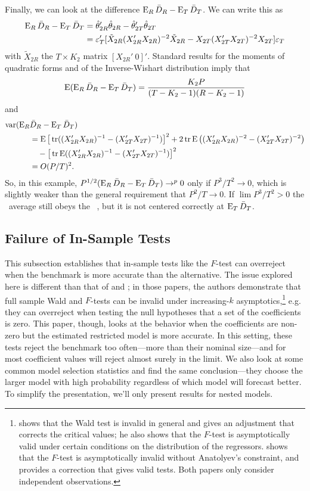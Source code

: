 \documentclass[11pt]{article}
\newcommand{\e}{\varepsilon}
\newcommand{\eb}{\mathbf{\e}}
\begin{document}
Finally, we can look at the difference $\operatorname{E}_R \bar{D}_R - \operatorname{E}_T
\bar{D}_T$.  We can write this as
\begin{align*}
  \E_R \oosA - \E_T \oosB &= \hat{\theta}_{2R}'
  \hat{\theta}_{2R} - \hat{\theta}_{2T}' \hat{\theta}_{2T} \\ &=
  \eb_T'[\tilde{X}_{2R}(X_{2R}'X_{2R})^{-2}
  \tilde{X}_{2R} - X_{2T}(X_{2T}'X_{2T})^{-2} X_{2T} ] \eb_T
\end{align*}
with $\tilde{X}_{2R}$ the $T \times K_2$ matrix $[X_{2R}'\ 0]'$.
Standard results for the moments of quadratic forms and of the
Inverse-Wishart distribution \citep{Haf:79} imply that
\begin{equation*}
  \operatorname{E}(\operatorname{E}_R \bar{D}_{R} - \operatorname{E}_T \bar{D}_{T}) = \frac{K_2 P}{(T - K_2 - 1)(R - K_2 - 1)}
\end{equation*}
and
\begin{align*}
  \operatorname{var}(\operatorname{E}_R & \bar{D}_{R} - \operatorname{E}_T \bar{D}_{T}) \\ &= \operatorname{E}
  \big[\operatorname{tr}((X_{2R}'X_{2R})^{-1} - (X_{2T}'X_{2T})^{-1})\big]^2 + 2 \operatorname{tr}
  \operatorname{E}\big((X_{2R}'X_{2R})^{-2} - (X_{2T}'X_{2T})^{-2}\big) \\ &\quad - \big[\operatorname{tr}
  \operatorname{E}((X_{2R}'X_{2R})^{-1} - (X_{2T}'X_{2T})^{-1}) \big]^2 \\ &=
  O(P/T)^2.
\end{align*}
So, in this example, $P^{1/2}(\operatorname{E}_R \bar{D}_{R} - \operatorname{E}_T \bar{D}_{T}) \to^p 0$ only
if $P^3/T^2 \to 0$, which is slightly weaker than the general
requirement that $P^2/T \to 0$.  If $\lim P^3/T^2 > 0$ the \oos\ average
still obeys the \mds\ \clt, but it is not centered correctly at $\operatorname{E}_T
\bar{D}_{T}$.

\subsection{Failure of In-Sample Tests}\label{sec:insample}
This subsection establishes that in-sample tests like the $F$-test can
overreject when the benchmark is more accurate than the alternative.
The issue explored here is different than that of \citet{Cal:11c} and
\citet{Ana:12}; in those papers, the authors demonstrate that full
sample Wald and $F$-tests can be invalid under increasing-$k$
asymptotics,\footnote{\citet{Ana:12} shows that the Wald test is
  invalid in general and gives an adjustment that corrects the
  critical values; he also shows that the $F$-test is asymptotically
  valid under certain conditions on the distribution of the
  regressors.  \citet{Cal:11c} shows that the $F$-test is
  asymptotically invalid without Anatolyev's constraint, and provides
  a correction that gives valid tests.  Both papers only consider
  independent observations.} e.g. they can overreject when testing the
null hypotheses that a set of the coefficients is zero.  This paper,
though, looks at the behavior when the coefficients are non-zero but
the estimated restricted model is more accurate.  In this setting,
these tests reject the benchmark too often---more than their nominal
size---and for most coefficient values will reject almost surely in
the limit.  We also look at some common model selection statistics and
find the same conclusion---they choose the larger model with high
probability regardless of which model will forecast better.  To
simplify the presentation, we'll only present results for nested
models.
\end{document}
